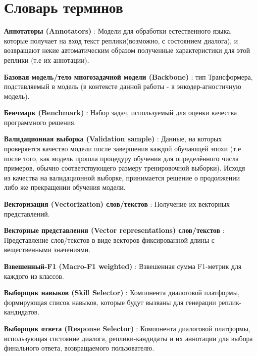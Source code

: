 \chapter*{Словарь терминов}             %
\textbf{Аннотаторы (Annotators)} : Модели для обработки естественного языка, которые получает на вход текст реплики(возможно, с состоянием диалога), и возвращают некие автоматическим образом полученные характеристики для этой реплики (т.е их аннотации). 

\textbf{Базовая модель/тело многозадачной модели (Backbone)} : тип Трансформера, подставляемый в модель (в контексте данной работы - в энкодер-агностичную модель).

\textbf{Бенчмарк (Benchmark)} : Набор задач, используемый для оценки качества программного решения.

\textbf{Валидационная выборка (Validation sample)} : Данные, на которых проверяется качество модели после завершения каждой обучающей эпохи (т.е после того, как модель прошла процедуру обучения для определённого числа примеров, обычно соответствующего размеру тренировочной выборки). Исходя из качества на валидационной выборке, принимается решение о продолжении либо же прекращении обучения модели.

\textbf{Векторизация (Vectorization) слов/текстов} : Получение их векторных представлений. 

\textbf{Векторные представления (Vector representations) слов/текстов} : Представление слов/текстов в виде векторов фиксированной длины с вещественными значениями.

\textbf{Взвешенный-F1 (Macro-F1 weighted)} : Взвешенная сумма F1-метрик для каждого из классов.

\textbf{Выборщик навыков (Skill Selector)} : Компонента диалоговой платформы, формирующая список навыков, которые будут вызваны для генерации реплик-кандидатов.

\textbf{Выборщик ответа (Response Selector)} : Компонента диалоговой платформы, использующая состояние диалога, реплики-кандидаты и их аннотации для выбора финального ответа, возвращаемого пользователю.

